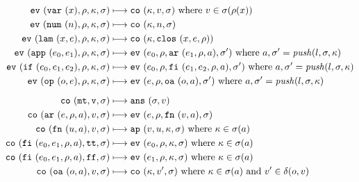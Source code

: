 \documentclass{llncs}
\begin{document}
\begin{figure}
\begin{align*}
\ev{\svar{x},\rho,\kappa,\sigma} &\machstep
\co{\kappa,v,\sigma}
\text{ where }v \in \msto(\menv(x))
\\
\ev{\snum{n},\menv,\mkont,\msto} &\machstep
\co{\mkont,n,\msto}
\\
\ev{\slam\mvar\mexp,\menv,\mkont,\msto} &\machstep
\co{\mkont,\clos{\mvar,\mexp,\menv}}
\\
\ev{\sapp{\mexpi0}{\mexpi1},\menv,\mkont,\msto} &\machstep
\ev{\mexpi{0},\menv,\kar{\mexpi{1},\menv,a},\msto'}
\text{ where }a,\msto' = \mathit{push}(l,\msto,\mkont)
\\
\ev{\sif{\mexpi0}{\mexpi1}{\mexpi2},\menv,\mkont,\msto} &\machstep
\ev{\mexpi0,\menv,\kif{\mexpi1,\mexpi2,\menv,\maddr},\msto'}
\text{ where }a,\msto' = \mathit{push}(l,\msto,\mkont)
\\
\ev{\sopu\mop\mexp,\menv,\mkont,\msto} &\machstep
\ev{\mexp,\menv,\kuop{\mop,\maddr},\msto'}
\text{ where }a,\msto' = \mathit{push}(l,\msto,\mkont)
\\[2mm]
\co{\kmt,\mval,\msto} &\machstep
\ans{\msto,\mval}
\\
\co{\kar{\mexp,\menv,\maddr},\mval,\msto} & \machstep
\ev{\mexp,\menv,\kfn{\mval,\maddr},\msto}
\\
\co{\kfn{{\mvalx{u}},\maddr},\mval,\msto} & \machstep
\ap{\mval,\mvalx{u},\mkont,\msto}
\text{ where }\mkont \in \msto(\maddr)
\\
\co{\kif{\mexpi0,\mexpi1,\menv,\maddr},\strue,\msto} & \machstep
\ev{\mexpi0,\menv,\mkont,\msto}
\text{ where }\mkont\in\msto(\maddr)
\\
\co{\kif{\mexpi0,\mexpi1,\menv,\maddr},\sfalse,\msto} & \machstep
\ev{\mexpi1,\menv,\mkont,\msto}
\text{ where }\mkont\in\msto(\maddr)
\\
\co{\kuop{\mop,\maddr},\mval,\msto} & \machstep
\co{\mkont,\mval',\msto}
\text{ where }\mkont\in\msto(\maddr)
\text{ and } \mval'\in\delta(\mop,\mval)

\end{align*}
\end{figure}
\end{document}
